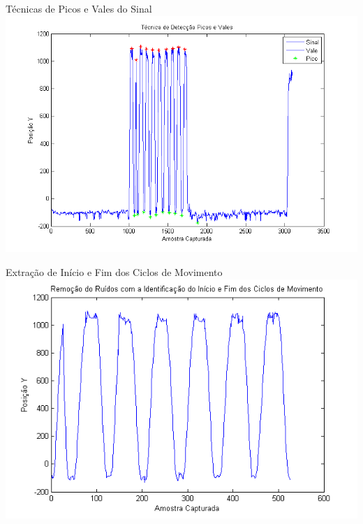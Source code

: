 \documentclass{beamer}
\begin{document}
\begin{frame}{Técnicas de Picos e Vales do Sinal}
      \center \includegraphics[height=3 in]{img/deteccaopicosvales.png}
\end{frame}

\begin{frame}{Extração de Início e Fim dos Ciclos de Movimento}
      \center \includegraphics[height=3 in]{img/remocaoruidociclo.png}
\end{frame}
\end{document}
